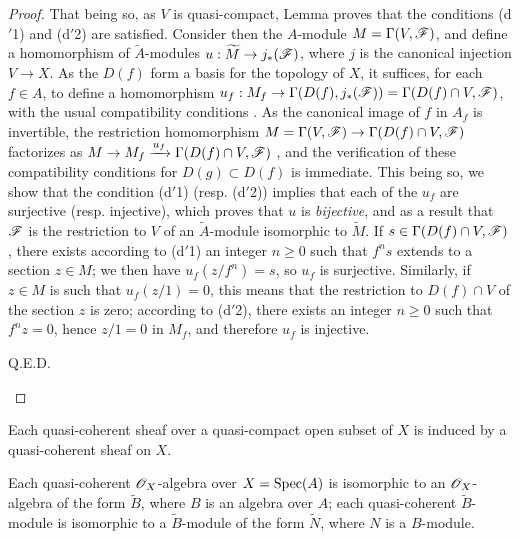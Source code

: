\begin{proof}
That being so, as $V$ is quasi-compact, Lemma  proves that
the conditions (d$'$1) and (d$'$2) are satisfied. Consider then the $A$-module
$M=\Gamma(V,\mathscr{F})$, and define a homomorphism of $\widetilde{A}$-modules
$u:\widetilde{M}\to j_*(\mathscr{F})$, where $j$ is the canonical injection $V\to X$. As the
$D(f)$ form a basis for the topology of $X$, it suffices, for each $f\in A$, to define a
homomorphism $u_f:M_f\to\Gamma(D(f),j_*(\mathscr{F}))=\Gamma(D(f)\cap V,\mathscr{F})$, with the usual
compatibility conditions . As the canonical image of $f$ in $A_f$ is
invertible, the restriction homomorphism $M=\Gamma(V,\mathscr{F})\to\Gamma(D(f)\cap V,\mathscr{F})$
factorizes as $M\to M_f\xrightarrow{u_f}\Gamma(D(f)\cap V,\mathscr{F})$ , and the
verification of these compatibility conditions for $D(g)\subset D(f)$ is immediate. This being
so, we show that the condition (d$'$1) (resp. (d$'$2)) implies that each of the $u_f$ are
surjective (resp. injective), which proves that $u$ is {\em bijective}, and as a result that
$\mathscr{F}$ is the restriction to $V$ of an $\widetilde{A}$-module isomorphic to
$\widetilde{M}$. If $s\in\Gamma(D(f)\cap V,\mathscr{F})$, there exists according to (d$'$1) an
integer $n\geqslant 0$ such that $f^n s$ extends to a section $z\in M$; we then have
$u_f(z/f^n)=s$, so $u_f$ is surjective. Similarly, if $z\in M$ is such that $u_f(z/1)=0$,
this means that the restriction to $D(f)\cap V$ of the section $z$ is zero; according to
(d$'$2), there exists an integer $n\geqslant 0$ such that $f^n z=0$, hence $z/1=0$ in $M_f$,
and therefore $u_f$ is injective.
\begin{flushright}
Q.E.D.
\end{flushright}
\end{proof}

\begin{cor}[1.4.2]
\label{1.1.4.2}
Each quasi-coherent sheaf over a quasi-compact open subset of $X$ is induced by a
quasi-coherent sheaf on $X$.
\end{cor}

\begin{cor}[1.4.3]
\label{1.1.4.3}
Each quasi-coherent $\mathscr{O}_X$-algebra over $X={\mathop{\mathrm{Spec}}\nolimits}(A)$ is isomorphic to an $\mathscr{O}_X$-algebra of
the form $\widetilde{B}$, where $B$ is an algebra over $A$; each quasi-coherent
$\widetilde{B}$-module is isomorphic to a $\widetilde{B}$-module of the form $\widetilde{N}$,
where $N$ is a $B$-module.
\end{cor}


